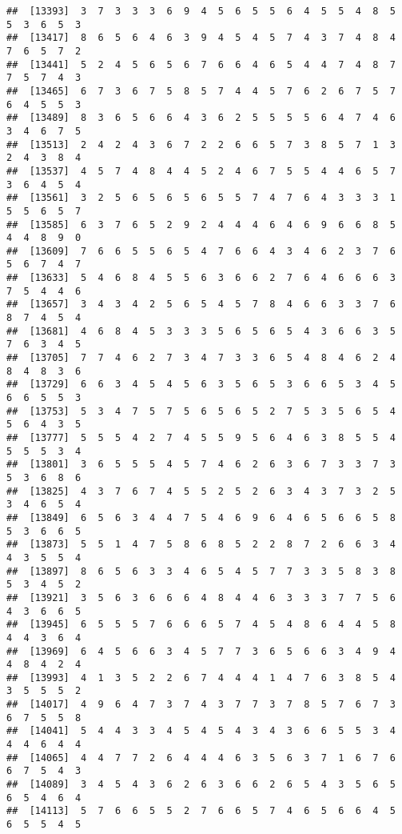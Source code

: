\documentclass[
]{book}
\begin{document}
\begin{verbatim}
##  [13393]  3  7  3  3  3  6  9  4  5  6  5  5  6  4  5  5  4  8  5  5  3  6  5  3
##  [13417]  8  6  5  6  4  6  3  9  4  5  4  5  7  4  3  7  4  8  4  7  6  5  7  2
##  [13441]  5  2  4  5  6  5  6  7  6  6  4  6  5  4  4  7  4  8  7  7  5  7  4  3
##  [13465]  6  7  3  6  7  5  8  5  7  4  4  5  7  6  2  6  7  5  7  6  4  5  5  3
##  [13489]  8  3  6  5  6  6  4  3  6  2  5  5  5  5  6  4  7  4  6  3  4  6  7  5
##  [13513]  2  4  2  4  3  6  7  2  2  6  6  5  7  3  8  5  7  1  3  2  4  3  8  4
##  [13537]  4  5  7  4  8  4  4  5  2  4  6  7  5  5  4  4  6  5  7  3  6  4  5  4
##  [13561]  3  2  5  6  5  6  5  6  5  5  7  4  7  6  4  3  3  3  1  5  5  6  5  7
##  [13585]  6  3  7  6  5  2  9  2  4  4  4  6  4  6  9  6  6  8  5  4  4  8  9  0
##  [13609]  7  6  6  5  5  6  5  4  7  6  6  4  3  4  6  2  3  7  6  5  6  7  4  7
##  [13633]  5  4  6  8  4  5  5  6  3  6  6  2  7  6  4  6  6  6  3  7  5  4  4  6
##  [13657]  3  4  3  4  2  5  6  5  4  5  7  8  4  6  6  3  3  7  6  8  7  4  5  4
##  [13681]  4  6  8  4  5  3  3  3  5  6  5  6  5  4  3  6  6  3  5  7  6  3  4  5
##  [13705]  7  7  4  6  2  7  3  4  7  3  3  6  5  4  8  4  6  2  4  8  4  8  3  6
##  [13729]  6  6  3  4  5  4  5  6  3  5  6  5  3  6  6  5  3  4  5  6  6  5  5  3
##  [13753]  5  3  4  7  5  7  5  6  5  6  5  2  7  5  3  5  6  5  4  5  6  4  3  5
##  [13777]  5  5  5  4  2  7  4  5  5  9  5  6  4  6  3  8  5  5  4  5  5  5  3  4
##  [13801]  3  6  5  5  5  4  5  7  4  6  2  6  3  6  7  3  3  7  3  5  3  6  8  6
##  [13825]  4  3  7  6  7  4  5  5  2  5  2  6  3  4  3  7  3  2  5  3  4  6  5  4
##  [13849]  6  5  6  3  4  4  7  5  4  6  9  6  4  6  5  6  6  5  8  5  3  6  6  5
##  [13873]  5  5  1  4  7  5  8  6  8  5  2  2  8  7  2  6  6  3  4  4  3  5  5  4
##  [13897]  8  6  5  6  3  3  4  6  5  4  5  7  7  3  3  5  8  3  8  5  3  4  5  2
##  [13921]  3  5  6  3  6  6  6  4  8  4  4  6  3  3  3  7  7  5  6  4  3  6  6  5
##  [13945]  6  5  5  5  7  6  6  6  5  7  4  5  4  8  6  4  4  5  8  4  4  3  6  4
##  [13969]  6  4  5  6  6  3  4  5  7  7  3  6  5  6  6  3  4  9  4  4  8  4  2  4
##  [13993]  4  1  3  5  2  2  6  7  4  4  4  1  4  7  6  3  8  5  4  3  5  5  5  2
##  [14017]  4  9  6  4  7  3  7  4  3  7  7  3  7  8  5  7  6  7  3  6  7  5  5  8
##  [14041]  5  4  4  3  3  4  5  4  5  4  3  4  3  6  6  5  5  3  4  4  4  6  4  4
##  [14065]  4  4  7  7  2  6  4  4  4  6  3  5  6  3  7  1  6  7  6  6  7  5  4  3
##  [14089]  3  4  5  4  3  6  2  6  3  6  6  2  6  5  4  3  5  6  5  6  5  4  6  4
##  [14113]  5  7  6  6  5  5  2  7  6  6  5  7  4  6  5  6  6  4  5  6  5  5  4  5

\end{verbatim}
\end{document}
